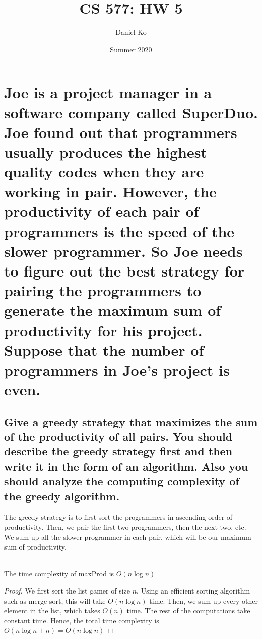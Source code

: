 \documentclass[11pt]{scrartcl}
\title{CS 577: HW 5}
\author{Daniel Ko}
\date{Summer 2020}
\begin{document}
\maketitle

\section{
  Joe is a project manager in a software company called SuperDuo. Joe found out that
  programmers usually produces the highest quality codes when they are working in pair.
  However, the productivity of each pair of programmers is the speed of the slower
  programmer. So Joe needs to figure out the best strategy for pairing the programmers to
  generate the maximum sum of productivity for his project. Suppose that the number of
  programmers in Joe’s project is even.
 }

\subsection{
	Give a greedy strategy that maximizes the sum of the productivity of all
	pairs. You should describe the greedy strategy first and then write it in the form of an
	algorithm. Also you should analyze the computing complexity of the greedy
	algorithm.
}
The greedy strategy is to first sort the programmers in ascending order of productivity.
Then, we pair the first two programmers, then the next two, etc. We sum up all the
slower programmer in each pair, which will be our maximum sum of productivity.
\begin{algorithm}
\end{algorithm}\\
The time complexity of maxProd is $O(n\log n)$
\begin{proof}
	We first sort the list gamer of size $n$. Using an efficient sorting algorithm such as
	merge sort, this will take $O(n\log n)$ time. Then, we sum up every other element
	in the list, which takes $O(n)$ time. The rest of the computations take constant time.
	Hence, the total time complexity is $O(n\log n + n) = O(n\log n)$
\end{proof}
\end{document}
